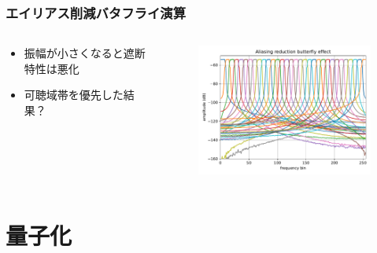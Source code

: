 \documentclass[14pt,xcolor=dvipsnames,table,dvipdfmx]{beamer}
\begin{document}
\begin{frame}[c]
    \frametitle{エイリアス削減バタフライ演算}
    \begin{columns}
        \begin{column}{0.35\textwidth}
            \begin{itemize}
                \item 振幅が小さくなると遮断特性は悪化
                \item 可聴域帯を優先した結果？
            \end{itemize}
        \end{column}
        \begin{column}{0.7\textwidth}
            \begin{figure}
                \includegraphics[width=85mm]{./figs/MP3_aliasing_reduction_butterfly_butterfly.pdf}
            \end{figure}
        \end{column}
    \end{columns}
\end{frame}

\section{量子化}
\end{document}
